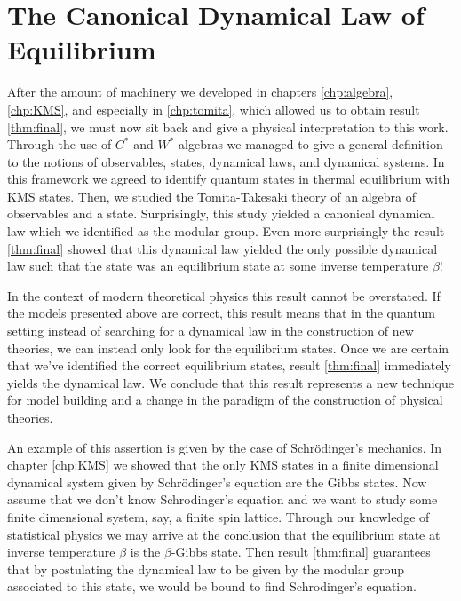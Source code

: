 \section{The Canonical Dynamical Law of Equilibrium}

After the amount of machinery we developed in chapters \ref{chp:algebra}, \ref{chp:KMS}, and especially in \ref{chp:tomita}, which allowed us to obtain result \ref{thm:final}, we must now sit back and give a physical interpretation to this work. Through the use of $C^*$ and $W^*$-algebras we managed to give a general definition to the notions of observables, states, dynamical laws, and dynamical systems. In this framework we agreed to identify quantum states in thermal equilibrium with KMS states. Then, we studied the Tomita-Takesaki theory of an algebra of observables and a state. Surprisingly, this study yielded a canonical dynamical law which we identified as the modular group. Even more surprisingly the result \ref{thm:final} showed that this dynamical law yielded the only possible dynamical law such that the state was an equilibrium state at some inverse temperature $\beta$!

In the context of modern theoretical physics this result cannot be overstated. If the models presented above are correct, this result means that in the quantum setting instead of searching for a dynamical law in the construction of new theories, we can instead only look for the equilibrium states. Once we are certain that we've identified the correct equilibrium states, result \ref{thm:final} immediately yields the dynamical law. We conclude that this result represents a new technique for model building and a change in the paradigm of the construction of physical theories.  

An example of this assertion is given by the case of Schrödinger's mechanics. In chapter \ref{chp:KMS} we showed that the only KMS states in a finite dimensional dynamical system given by Schrödinger's equation are the Gibbs states. Now assume that we don't know Schrodinger's equation and we want to study some finite  dimensional system, say, a finite spin lattice. Through our knowledge of statistical physics we may arrive at the conclusion that the equilibrium state at inverse temperature $\beta$ is the $\beta$-Gibbs state. Then result \ref{thm:final} guarantees that by postulating the dynamical law to be given by the modular group associated to this state, we would be bound to find Schrodinger's equation. 